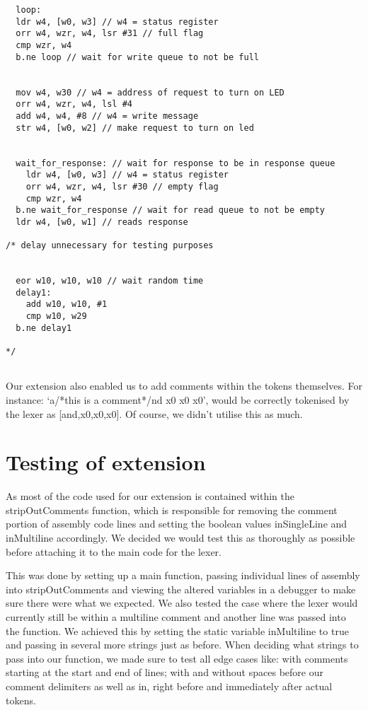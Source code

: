 \documentclass[11pt]{article}
\begin{document}
\begin{verbatim}
  loop:
  ldr w4, [w0, w3] // w4 = status register
  orr w4, wzr, w4, lsr #31 // full flag
  cmp wzr, w4
  b.ne loop // wait for write queue to not be full
 
 
  mov w4, w30 // w4 = address of request to turn on LED
  orr w4, wzr, w4, lsl #4
  add w4, w4, #8 // w4 = write message
  str w4, [w0, w2] // make request to turn on led
 
 
  wait_for_response: // wait for response to be in response queue
    ldr w4, [w0, w3] // w4 = status register
    orr w4, wzr, w4, lsr #30 // empty flag
    cmp wzr, w4
  b.ne wait_for_response // wait for read queue to not be empty
  ldr w4, [w0, w1] // reads response
 
/* delay unnecessary for testing purposes


  eor w10, w10, w10 // wait random time
  delay1:
    add w10, w10, #1
    cmp w10, w29
  b.ne delay1
 
*/


\end{verbatim}


Our extension also enabled us to add comments within the tokens themselves. For instance:
‘a/*this is a comment*/nd x0 x0 x0’, would be correctly tokenised by the lexer as [and,x0,x0,x0]. Of course, we didn’t utilise this as much.

\section{Testing of extension}
As most of the code used for our extension is contained within the stripOutComments function, which is responsible for removing the comment portion of assembly code lines and setting the boolean values inSingleLine and inMultiline accordingly. We decided we would test this as thoroughly as possible before attaching it to the main code for the lexer.

This was done by setting up a main function, passing individual lines of assembly into stripOutComments and viewing the altered variables in a debugger to make sure there were what we expected. We also tested the case where the lexer would currently still be within a multiline comment and another line was passed into the function. We achieved this by setting the static variable inMultiline to true and passing in several more strings just as before. When deciding what strings to pass into our function, we made sure to test all edge cases like: with comments starting at the start and end of lines; with and without spaces before our comment delimiters as well as in, right before and immediately after actual tokens.
\end{document}
